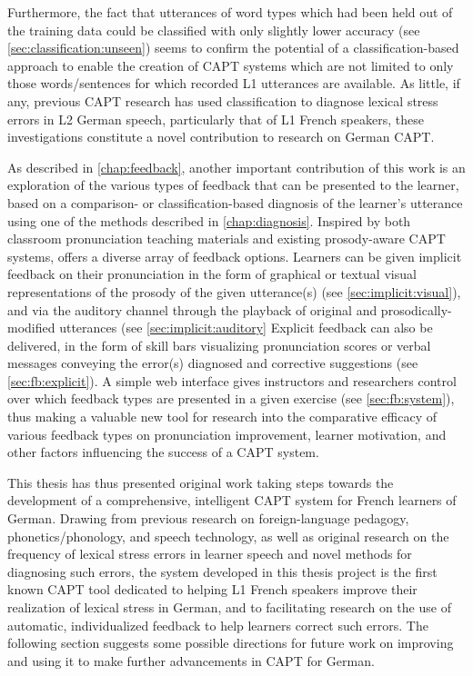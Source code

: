 	Furthermore, the fact that utterances of word types which had been held out of the training data could be classified with only slightly lower accuracy (see \cref{sec:classification:unseen}) seems to confirm the potential of a classification-based approach to enable the creation of CAPT systems which are not limited to only those words/sentences for which recorded L1 utterances are available.
	As little, if any, previous CAPT research has used classification to diagnose lexical stress errors in L2 German speech, particularly that of L1 French speakers, these investigations constitute 
	a novel contribution
	to research on German CAPT.




%
As described in \cref{chap:feedback}, another important contribution of this work is an exploration of the various types of feedback that can be presented to the learner, based on a comparison- or classification-based diagnosis of the learner's utterance using one of the methods described in \cref{chap:diagnosis}. 
	Inspired by both classroom pronunciation teaching materials and existing prosody-aware CAPT systems,  offers a diverse array of feedback options. Learners can be given implicit feedback on their pronunciation in the form of graphical or textual visual representations of the prosody of the given utterance(s) (see \cref{sec:implicit:visual}), and via the auditory channel through the playback of original and prosodically-modified utterances (see \cref{sec:implicit:auditory}
	Explicit feedback can also be delivered, in the form of skill bars visualizing pronunciation scores or verbal messages conveying the error(s) diagnosed and corrective suggestions (see \cref{sec:fb:explicit}).
	A simple web interface gives  instructors and researchers control over which feedback types are presented in a given exercise (see \cref{sec:fb:system}), thus making  a valuable new tool for research into the comparative efficacy of various feedback types on pronunciation improvement, learner motivation, and other factors influencing the success of a CAPT system. 



%
This thesis has thus presented original work taking steps towards the development of a comprehensive, intelligent CAPT system for French learners of German. Drawing from previous research on foreign-language pedagogy, phonetics/phonology, and speech technology, as well as original research on the frequency of lexical stress errors in learner speech and novel methods for diagnosing such errors, the  system developed in this thesis project is the first known CAPT tool dedicated to helping L1 French speakers improve their realization of lexical stress in German, and to facilitating research on the use of automatic, individualized feedback to help learners correct such errors. The following section suggests some possible directions for future work on improving  and using it to make further advancements in CAPT for German.


